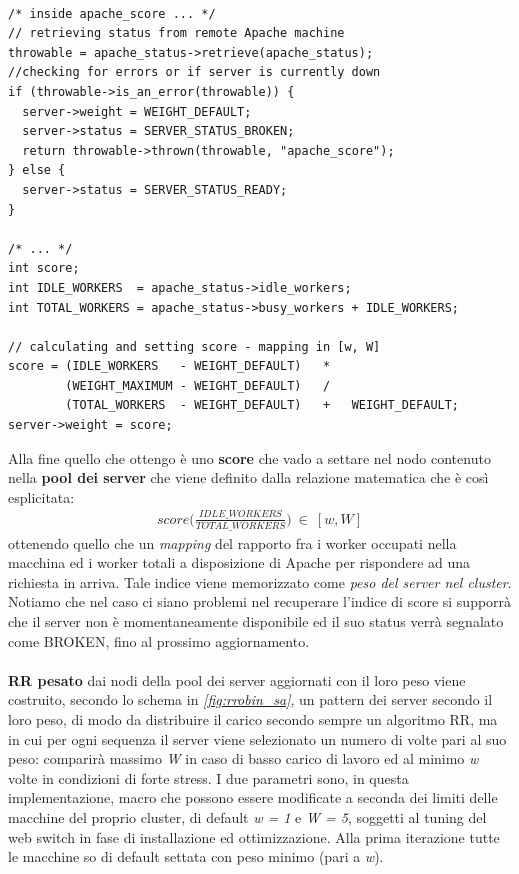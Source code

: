 \documentclass[italian]{tktltiki2}
\begin{document}
\\
\begin{lstlisting}
/* inside apache_score ... */
// retrieving status from remote Apache machine
throwable = apache_status->retrieve(apache_status);   
//checking for errors or if server is currently down
if (throwable->is_an_error(throwable)) {
  server->weight = WEIGHT_DEFAULT;
  server->status = SERVER_STATUS_BROKEN;
  return throwable->thrown(throwable, "apache_score");
} else {
  server->status = SERVER_STATUS_READY;
}

/* ... */
int score;
int IDLE_WORKERS  = apache_status->idle_workers;
int TOTAL_WORKERS = apache_status->busy_workers + IDLE_WORKERS;

// calculating and setting score - mapping in [w, W]
score = (IDLE_WORKERS   - WEIGHT_DEFAULT)   *
        (WEIGHT_MAXIMUM - WEIGHT_DEFAULT)   /
        (TOTAL_WORKERS  - WEIGHT_DEFAULT)   +   WEIGHT_DEFAULT;
server->weight = score;
\end{lstlisting}
Alla fine quello che ottengo è uno \textbf{score} che vado a settare nel nodo contenuto nella \textbf{pool dei server} che viene definito dalla relazione matematica che è così esplicitata:
\begin{align*}
  score\Big(\frac{IDLE\_WORKERS}{TOTAL\_WORKERS}\Big) ~ \in ~ [w, W]
\end{align*}
ottenendo quello che un \emph{mapping} del rapporto fra i worker occupati nella macchina ed i worker totali a disposizione di Apache per rispondere ad una richiesta in arriva. Tale indice viene memorizzato come \emph{peso del server nel cluster}.
\\
Notiamo che nel caso ci siano problemi nel recuperare l'indice di score si supporrà che il server non è momentaneamente disponibile ed il suo status verrà segnalato come BROKEN, fino al prossimo aggiornamento.
\\
\\
\textbf{RR pesato} dai nodi della pool dei server aggiornati con il loro peso viene costruito, secondo lo schema in \emph{\ref{fig:rrobin_sa}}, un pattern dei server secondo il loro peso, di modo da distribuire il carico secondo sempre un algoritmo RR, ma in cui per ogni sequenza il server viene selezionato un numero di volte pari al suo peso: comparirà massimo \emph{W} in caso di basso carico di lavoro ed al minimo \emph{w} volte in condizioni di forte stress. I due parametri sono, in questa implementazione, macro che possono essere modificate a seconda dei limiti delle macchine del proprio cluster, di default \emph{w = 1} e \emph{W = 5}, soggetti al tuning del web switch in fase di installazione ed ottimizzazione. Alla prima iterazione tutte le macchine so di default settata con peso minimo (pari a \emph{w}).
\end{document}

